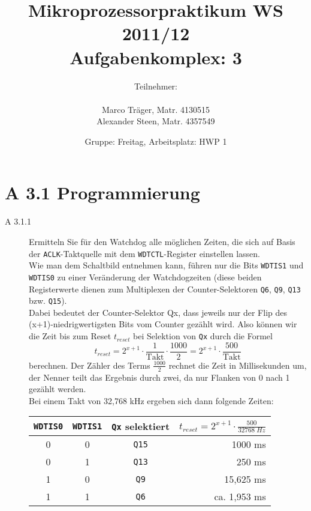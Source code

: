 \documentclass[11pt,a4paper,ngerman]{article}
\author{Teilnehmer:\\ \\Marco Träger, Matr. 4130515\\Alexander Steen, Matr. 4357549}
\date{Gruppe: Freitag, Arbeitsplatz: HWP 1}
\title{Mikroprozessorpraktikum WS 2011/12\\ Aufgabenkomplex: 3}
\begin{document}

\maketitle
\thispagestyle{fancy}
\newpage
\section*{A 3.1 Programmierung}

\begin{description}
	\item[A 3.1.1] Ermitteln Sie für den Watchdog alle möglichen Zeiten, die sich auf Basis der \texttt{ACLK}-Taktquelle mit dem \texttt{WDTCTL}-Register einstellen lassen. \\
	
	Wie man dem Schaltbild entnehmen kann, führen nur die Bits \texttt{WDTIS1} und \texttt{WDTIS0} zu einer Veränderung der Watchdogzeiten (diese beiden Registerwerte dienen zum Multiplexen der Counter-Selektoren \texttt{Q6}, \texttt{Q9}, \texttt{Q13} bzw. \texttt{Q15}).
	\\
	Dabei bedeutet der Counter-Selektor Qx, dass jeweils nur der Flip des (x+1)-niedrigwertigsten Bits vom Counter gezählt wird.
	Also können wir die Zeit bis zum Reset $t_{reset}$ bei Selektion von \texttt{Qx} durch die Formel
	$$ 
		t_{reset} = 2^{x+1} \cdot  \frac{1}{\text{Takt}} \cdot \frac{1000}{2}
		=  2^{x+1} \cdot  \frac{500}{\text{Takt}}
	$$
	berechnen. Der Zähler des Terms $\frac{1000}{2}$ rechnet die Zeit in Millisekunden um, der Nenner teilt das Ergebnis durch zwei, da nur Flanken von 0 nach 1 gezählt werden. \\
	Bei einem Takt von 32,768 kHz ergeben sich dann folgende Zeiten: \\
	
	\begin{tabular}{c|c|c|r}
	\texttt{WDTIS0} & \texttt{WDTIS1} & \texttt{Qx} selektiert & $t_{reset} = 2^{x+1} \cdot \frac{500}{32768 \; Hz}$ \\ 
	\hline \hline
	0 & 0 & \texttt{Q15} & 1000 ms \\
	0 & 1 & \texttt{Q13} & 250 ms \\
	1 & 0 & \texttt{Q9} & 15,625 ms \\
	1 & 1 & \texttt{Q6} & ca. 1,953 ms \\
	\end{tabular}
	\\
	

\end{description}
\end{document}
